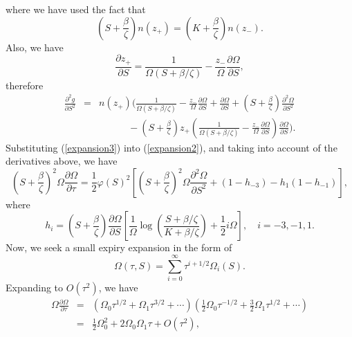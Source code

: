 \documentclass[12pt]{article}
\begin{document}
    where we have used the fact that
    \begin{equation}
      \left(S+\frac{\beta}{\zeta}\right)n(z_+) = \left(K+\frac{\beta}{\zeta}\right)n(z_-).
    \end{equation}
    Also, we have
    \begin{equation}
      \frac{\partial z_+}{\partial S} = \frac{1}{\Omega(S+\beta/\zeta)}-\frac{z_-}{\Omega}\frac{\partial\Omega}{\partial S},
    \end{equation}
    therefore
    \begin{eqnarray}
      \frac{\partial^2 g}{\partial S^2}
      &=& n(z_+)\Bigg(\frac{1}{\Omega(S+\beta/\zeta)}-\frac{z_-}{\Omega}\frac{\partial\Omega}{\partial S} + \frac{\partial \Omega}{\partial S}
          + \left(S+\frac{\beta}{\zeta}\right)\frac{\partial^2 \Omega}{\partial S^2}\nonumber\\
      &&  \quad\quad\quad - \left(S+\frac{\beta}{\zeta}\right)z_+\left(\frac{1}{\Omega(S+\beta/\zeta)}-\frac{z_-}{\Omega}
                            \frac{\partial\Omega}{\partial S}\right) \frac{\partial \Omega}{\partial S}\Bigg).
    \end{eqnarray}
    Substituting (\ref{expansion3}) into (\ref{expansion2}), and taking into account of the derivatives above, we have
    \begin{equation}
      \left(S+\frac{\beta}{\zeta}\right)^2\Omega\frac{\partial \Omega}{\partial\tau} =
      \frac{1}{2}\varphi(S)^2\left[\left(S+\frac{\beta}{\zeta}\right)^2\Omega\frac{\partial^2 \Omega}{\partial S^2}
                                   +(1-h_{-3})-h_1(1-h_{-1})\right],
      \label{expansion4}
    \end{equation}
    where
    \begin{equation}
      h_i=\left(S+\frac{\beta}{\zeta}\right)\frac{\partial \Omega}{\partial S}
          \left[\frac{1}{\Omega}\log\left(\frac{S+\beta / \zeta}{K+\beta / \zeta}\right)+\frac{1}{2}i\Omega\right],\quad
          i=-3,-1,1.
    \end{equation}
    Now, we seek a small expiry expansion in the form of
    \begin{equation}
      \Omega(\tau,S)=\sum_{i=0}^{\infty}\tau^{i+1/2}\Omega_i(S).
    \end{equation}
    Expanding to $O(\tau^2)$, we have
    \begin{eqnarray}
      \Omega\frac{\partial \Omega}{\partial\tau} &=& \left(\Omega_0\tau^{1/2}+\Omega_1\tau^{3/2}+\cdots\right)
                                                     \left(\frac{1}{2}\Omega_0\tau^{-1/2}+\frac{3}{2}\Omega_1\tau^{1/2}+\cdots\right)\nonumber\\
                                                 &=& \frac{1}{2}\Omega_0^2 + 2\Omega_0\Omega_1\tau + O(\tau^2),
    \end{eqnarray}
\end{document}
